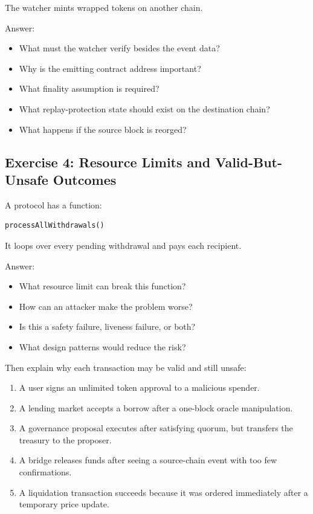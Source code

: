 The watcher mints wrapped tokens on another chain.

Answer:

\begin{itemize}
\tightlist
\item
  What must the watcher verify besides the event data?
\item
  Why is the emitting contract address important?
\item
  What finality assumption is required?
\item
  What replay-protection state should exist on the destination chain?
\item
  What happens if the source block is reorged?
\end{itemize}

\subsection{Exercise 4: Resource Limits and Valid-But-Unsafe Outcomes}

A protocol has a function:

\begin{lstlisting}
processAllWithdrawals()
\end{lstlisting}

It loops over every pending withdrawal and pays each recipient.

Answer:

\begin{itemize}
\tightlist
\item
  What resource limit can break this function?
\item
  How can an attacker make the problem worse?
\item
  Is this a safety failure, liveness failure, or both?
\item
  What design patterns would reduce the risk?
\end{itemize}

Then explain why each transaction may be valid and still unsafe:

\begin{enumerate}
\def\labelenumi{\arabic{enumi}.}
\tightlist
\item
  A user signs an unlimited token approval to a malicious spender.
\item
  A lending market accepts a borrow after a one-block oracle
  manipulation.
\item
  A governance proposal executes after satisfying quorum, but transfers
  the treasury to the proposer.
\item
  A bridge releases funds after seeing a source-chain event with too few
  confirmations.
\item
  A liquidation transaction succeeds because it was ordered immediately
  after a temporary price update.
\end{enumerate}

